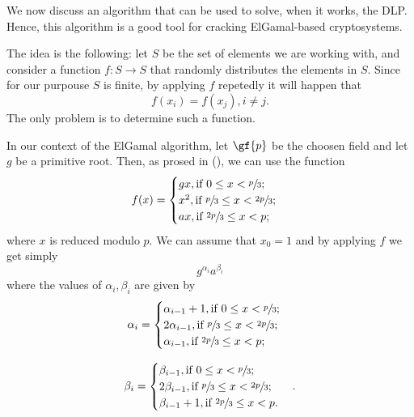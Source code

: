 \documentclass{subfiles}
\begin{document}
    We now discuss an algorithm that can be used to solve, when it works, the DLP.
        Hence, this algorithm is a good tool for cracking ElGamal-based cryptosystems.

    The idea is the following: let \(S\) be the set of elements we are working with,
        and consider a function \(f : S \to S\) that randomly distributes the elements in \(S\).
        Since for our purpouse \(S\) is finite, by applying \(f\) repetedly 
        it will happen that 
        \[
            f(x_{i}) = f(x_{j}), i \ne j.
        \]
    The only problem is to determine such a function.

    In our context of the ElGamal algorithm, let \(\gf{p}\) be the choosen field 
        and let \(g\) be a primitive root. Then, as prosed in (\cite{pollard1996}),
        we can use the function
        \[
            f(x) = \begin{cases}
                gx, \text{if } 0 \le x < \sfrac{p}{3}; \\ 
                x^{2}, \text{if } \sfrac{p}{3} \le x < \sfrac{2p}{3}; \\ 
                ax, \text{if } \sfrac{2p}{3} \le x < p;
            \end{cases}
        \]
        where \(x\) is reduced modulo \(p\). We can assume that \(x_{0} = 1\) and
        by applying \(f\) we get simply 
        \[
            g^{\alpha_{i}}a^{\beta_{i}}
        \]
        where the values of \(\alpha_{i}, \beta_{i}\) are given by 
        \[\alpha_{i} = \begin{cases}
                \alpha_{i - 1} + 1, \text{if } 0 \le x < \sfrac{p}{3}; \\ 
                2\alpha_{i - 1}, \text{if } \sfrac{p}{3} \le x < \sfrac{2p}{3}; \\ 
                \alpha_{i - 1}, \text{if } \sfrac{2p}{3} \le x < p;
            \end{cases}\]


        \[\beta_{i} = \begin{cases}
            \beta_{i - 1}, \text{if } 0 \le x < \sfrac{p}{3}; \\ 
            2\beta_{i - 1}, \text{if } \sfrac{p}{3} \le x < \sfrac{2p}{3}; \\ 
            \beta_{i - 1} + 1, \text{if } \sfrac{2p}{3} \le x < p.
        \end{cases}.\]
\end{document}
